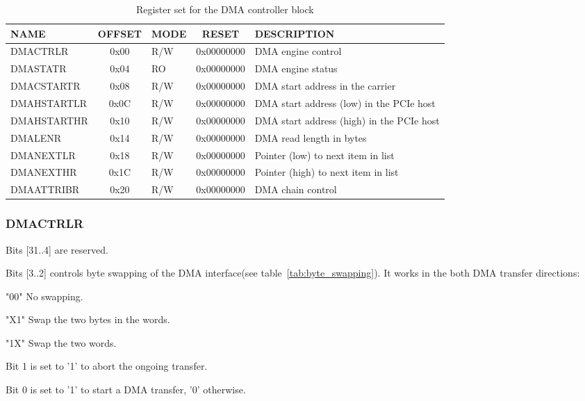 \documentclass[10pt,a4paper]{cerndoc}
\begin{document}
\begin{table}[htbp]
  \centering
  \begin{tabularx}{\textwidth}{|l|c|l|c|X|}                                                   \hline
    \textbf{NAME}  & \textbf{OFFSET} & \textbf{MODE} & \textbf{RESET} & \textbf{DESCRIPTION}  \\ \hline \hline
    DMACTRLR       & 0x00 & R/W & 0x00000000 & DMA engine control                                       \\ \hline
    DMASTATR       & 0x04 & RO  & 0x00000000 & DMA engine status                                              \\ \hline
    DMACSTARTR     & 0x08 & R/W & 0x00000000 & DMA start address in the carrier                               \\ \hline
    DMAHSTARTLR    & 0x0C & R/W & 0x00000000 & DMA start address (low) in the PCIe host                       \\ \hline
    DMAHSTARTHR    & 0x10 & R/W & 0x00000000 & DMA start address (high) in the PCIe host                      \\ \hline
    DMALENR        & 0x14 & R/W & 0x00000000 & DMA read length in bytes                                       \\ \hline
    DMANEXTLR      & 0x18 & R/W & 0x00000000 & Pointer (low) to next item in list                             \\ \hline
    DMANEXTHR      & 0x1C & R/W & 0x00000000 & Pointer (high) to next item in list                            \\ \hline
    DMAATTRIBR     & 0x20 & R/W & 0x00000000 & DMA chain control                                              \\ \hline
  \end{tabularx}
  \caption{Register set for the DMA controller block}
  \label{tab:dma_control}
\end{table}


\newpage
\subsubsection{DMACTRLR}
\begin{packed_item}
\item Bits [31..4] are reserved.
\item Bits [3..2] controls byte swapping of the DMA interface(see table~\ref{tab:byte_swapping}). It works in the both DMA transfer directions:
  \begin{packed_item}
    \item "00" No swapping.
    \item "X1" Swap the two bytes in the words.
    \item "1X" Swap the two words.
  \end{packed_item}
\item Bit 1 is set to '1' to abort the ongoing transfer.
\item Bit 0 is set to '1' to start a DMA transfer, '0' otherwise.
\end{packed_item}
\end{document}
